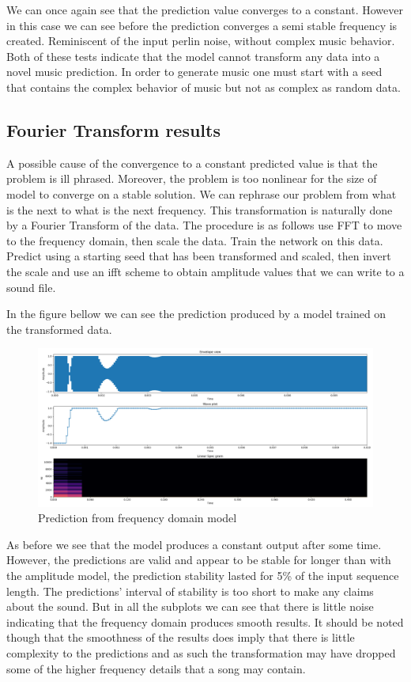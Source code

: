 \documentclass{article}
\begin{document}
We can once again see that the prediction value converges to a constant. However in this case we can see before the prediction converges a semi stable frequency is created. Reminiscent of the input perlin noise, without complex music behavior. Both of these tests indicate that the model cannot transform any data into a novel music prediction. In order to generate music one must start with a seed that contains the complex behavior of music but not as complex as random data. 
\subsection{Fourier Transform results}
A possible cause of the convergence to a constant predicted value is that the problem is ill phrased. Moreover, the problem is too nonlinear for the size of model to converge on a stable solution. We can rephrase our problem from what is the next to what is the next frequency. This transformation is naturally done by a Fourier Transform of the data. The procedure is as follows use FFT to move to the frequency domain, then scale the data. Train the network on this data. Predict using a starting seed that has been transformed and scaled, then invert the scale and use an ifft scheme to obtain amplitude values that we can write to a sound file. 

In the figure bellow we can see the prediction produced by a model trained on the transformed data. 
\begin{figure}[H]
\caption{Prediction from frequency domain model}
\includegraphics[scale=0.35]{fs_prediction.png}
\end{figure}
As before we see that the model produces a constant output after some time. However, the predictions are valid and appear to be stable for longer than with the amplitude model, the prediction stability lasted for 5\% of the input sequence length. The predictions' interval of stability is too short to make any claims about the sound. But in all the subplots we can see that there is little noise indicating that the frequency domain produces smooth results. It should be noted though that the smoothness of the results does imply that there is little complexity to the predictions and as such the transformation may have dropped some of the higher frequency details that a song may contain.  
\end{document}

